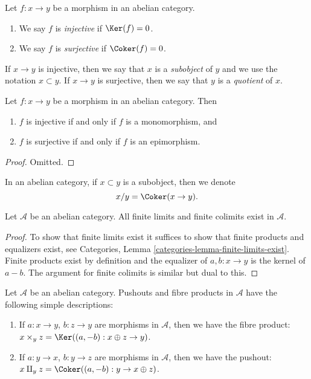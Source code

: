 \begin{definition}
\label{definition-injective-surjective}
Let $f : x \to y$ be a morphism in an abelian category.
\begin{enumerate}
\item We say $f$ is {\it injective} if $\Ker(f) = 0$.
\item We say $f$ is {\it surjective} if $\Coker(f) = 0$.
\end{enumerate}
If $x \to y$ is injective, then we say that $x$ is a {\it subobject}
of $y$ and we use the notation $x \subset y$. If $x \to y$ is
surjective, then we say that $y$ is a {\it quotient} of $x$.
\end{definition}

\begin{lemma}
\label{lemma-characterize-injective}
Let $f : x \to y$ be a morphism in an abelian category. Then
\begin{enumerate}
\item $f$ is injective if and only if $f$ is a monomorphism, and
\item $f$ is surjective if and only if $f$ is an epimorphism.
\end{enumerate}
\end{lemma}

\begin{proof}
Omitted.
\end{proof}

\noindent
In an abelian category, if $x \subset y$ is a subobject,
then we denote
$$
x/y = \Coker(x \to y).
$$

\begin{lemma}
\label{lemma-colimit-abelian-category}
Let $\mathcal{A}$ be an abelian category.
All finite limits and finite colimits exist in $\mathcal{A}$.
\end{lemma}

\begin{proof}
To show that finite limits exist it suffices to show
that finite products and equalizers exist, see
Categories, Lemma \ref{categories-lemma-finite-limits-exist}.
Finite products exist
by definition and the equalizer of $a, b : x \to y$ is
the kernel of $a - b$. The argument for finite colimits
is similar but dual to this.
\end{proof}

\begin{example}
\label{example-fibre-product-pushouts}
Let $\mathcal{A}$ be an abelian category.
Pushouts and fibre products in $\mathcal{A}$ have the following
simple descriptions:
\begin{enumerate}
\item If $a : x \to y$, $b : z \to y$ are morphisms in $\mathcal{A}$, then
we have the fibre product:
$x \times_y z = \Ker((a, -b) : x \oplus z \to y)$.
\item If $a : y \to x$, $b : y \to z$ are morphisms in $\mathcal{A}$, then
we have the pushout:
$x \amalg_y z = \Coker((a, -b) : y \to x \oplus z)$.
\end{enumerate}
\end{example}


